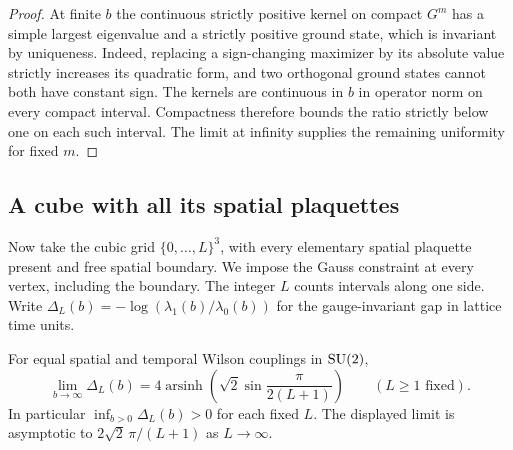 \begin{proof}
At finite \(b\) the continuous strictly positive kernel on compact \(G^m\)
has a simple largest eigenvalue and a strictly positive ground state, which
is invariant by uniqueness. Indeed, replacing a sign-changing maximizer
by its absolute value strictly increases its quadratic form, and two
orthogonal ground states cannot both have constant sign. The kernels are
continuous in \(b\) in operator norm on every compact interval. Compactness
therefore bounds the ratio strictly below one on each such interval.
The limit at infinity supplies the remaining uniformity for fixed \(m\).
\end{proof}

\subsection*{A cube with all its spatial plaquettes}
Now take the cubic grid \(\{0,\ldots,L\}^3\), with every elementary
spatial plaquette present and free spatial boundary. We impose the Gauss
constraint at every vertex, including the boundary. The integer \(L\)
counts intervals along one side. Write \(\Delta_L(b)=
-\log(\lambda_1(b)/\lambda_0(b))\) for the gauge-invariant gap in lattice
time units.

\begin{theorem}\label{thm:isotropic-free-box}
For equal spatial and temporal Wilson couplings in \(\mathrm{SU}(2)\),
\[
 \lim_{b\to\infty}\Delta_L(b)
    =4\operatorname{arsinh}\!\left(\sqrt2\sin\frac{\pi}{2(L+1)}\right)
 \qquad (L\ge1\text{ fixed}).
\]
In particular \(\inf_{b>0}\Delta_L(b)>0\) for each fixed \(L\).
The displayed limit is asymptotic to \(2\sqrt2\,\pi/(L+1)\) as
\(L\to\infty\).
\end{theorem}

